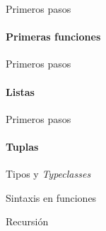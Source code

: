 \documentclass{beamer}
\begin{document}
\begin{frame}{Primeros pasos}      %
  \framesubtitle{Primeras funciones}

\end{frame}

\begin{frame}{Primeros pasos}      %
  \framesubtitle{Listas}

\end{frame}

\begin{frame}{Primeros pasos}      %
  \framesubtitle{Tuplas}

\end{frame}


\begin{frame}{Tipos y \emph{Typeclasses}}      %

\end{frame}


\begin{frame}{Sintaxis en funciones}      %

\end{frame}


\begin{frame}{Recursión}      %

\end{frame}
\end{document}

